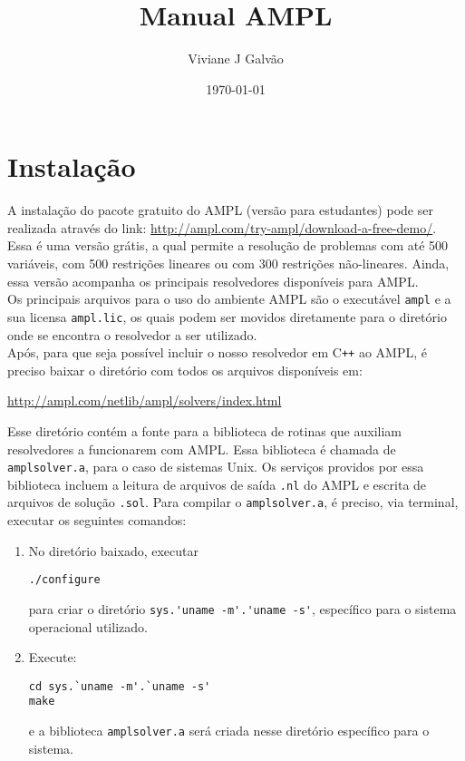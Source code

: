 \documentclass[a4paper, 12pt]{article}
\title{Manual AMPL}
\author{Viviane J Galvão}
\date{\today}
\begin{document}
\maketitle

\section{Instalação}
A instalação do pacote gratuito do AMPL (versão para estudantes) pode ser realizada através do link: \url{http://ampl.com/try-ampl/download-a-free-demo/}.\\

Essa é uma versão grátis, a qual permite a resolução de problemas com até 500 variáveis, com 500 restrições lineares ou com 300 restrições não-lineares. Ainda, essa versão acompanha os principais resolvedores disponíveis para AMPL.\\

Os principais arquivos para o uso do ambiente AMPL são o executável \verb|ampl| e a sua licensa \verb|ampl.lic|, os quais podem ser movidos diretamente para o diretório onde se encontra o resolvedor a ser utilizado.\\

Após, para que seja possível incluir o nosso resolvedor em C\verb|++| ao AMPL, é preciso baixar o diretório com todos os arquivos disponíveis em: 
\begin{center}
\url{http://ampl.com/netlib/ampl/solvers/index.html}
\end{center}
Esse diretório contém a fonte para a biblioteca de rotinas que auxiliam resolvedores a funcionarem com AMPL. Essa biblioteca é chamada de \verb|amplsolver.a|, para o caso de sistemas Unix. Os serviços providos por essa biblioteca incluem a leitura de arquivos de saída \verb|.nl| do AMPL e escrita de arquivos de solução \verb|.sol|. Para compilar o \verb|amplsolver.a|, é preciso, via terminal, executar os seguintes comandos:
\begin{enumerate}
\item No diretório baixado, executar
\begin{verbatim}
./configure
\end{verbatim}
para criar o diretório \verb|sys.'uname -m'.'uname -s'|, específico para o sistema operacional utilizado. 
\item Execute:
\begin{verbatim}
cd sys.`uname -m'.`uname -s'
make
\end{verbatim}
e a biblioteca \verb|amplsolver.a| será criada nesse diretório específico para o sistema.
\end{enumerate} 
\end{document}
